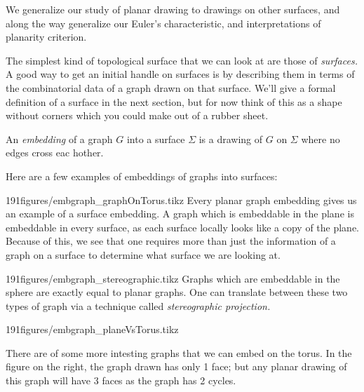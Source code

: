
\begin{elevator}
We generalize our study of planar drawing to drawings on other surfaces, and along the way generalize our Euler's characteristic, and interpretations of planarity criterion. 
\label{sec:planar:surfaces}
\end{elevator}
The simplest kind of topological surface that we can look at are those of \emph{surfaces.} A good way to get an initial handle on surfaces is by describing them in terms of the combinatorial data of a graph drawn on that surface. We'll give a formal definition of a surface in the next section, but for now think of this as a shape without corners which you could make out of a rubber sheet.
\begin{definition}
An \emph{embedding} of a graph $G$ into a surface $\Sigma$ is a drawing of $G$ on $\Sigma$ where no edges cross eac hother. 
\end{definition}
Here are a few examples of embeddings of graphs into surfaces:

\begin{examplefigureenv}{191figures/embgraph_graphOnTorus.tikz}
	Every planar graph embedding gives us an example of a surface embedding. A graph which is embeddable in the plane is embeddable in every surface, as each surface locally looks like a copy of the plane. Because of this, we see that one requires more than just the information of a graph on a surface to determine what surface we are looking at. 
\end{examplefigureenv}



\begin{examplefigureenv}{191figures/embgraph_stereographic.tikz}
	Graphs which are embeddable in the sphere are exactly equal to planar graphs. One can translate between these two types of graph via a technique called \emph{stereographic projection.}
\end{examplefigureenv}

\begin{examplefigureenv}{191figures/embgraph_planeVsTorus.tikz}
	
There are of some more intesting graphs that we can embed on the torus. In the figure on the right, the graph drawn has only 1 face; but any planar drawing of this graph will have 3 faces as the graph has 2 cycles. 
\end{examplefigureenv}

